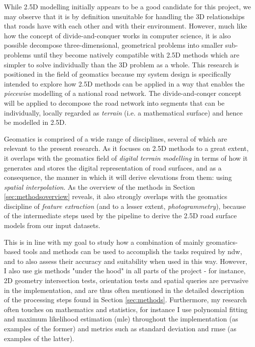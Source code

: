 While 2.5D modelling initially appears to be a good candidate for this project, we may observe that it is by definition unsuitable for handling the 3D relationships that roads have with each other and with their environment. However, much like how the concept of divide-and-conquer works in computer science, it is also possible decompose three-dimensional, geometrical problems into smaller sub-problems until they become natively compatible with 2.5D methods which are simpler to solve individually than the 3D problem as a whole. This research is positioned in the field of geomatics because my system design is specifically intended to explore how 2.5D methods can be applied in a way that enables the \textit{piecewise} modelling of a national road network. The divide-and-conqer concept will be applied to decompose the road network into segments that can be individually, locally regarded as \textit{terrain} (i.e. a mathematical surface) and hence be modelled in 2.5D.

Geomatics is comprised of a wide range of disciplines, several of which are relevant to the present research. As it focuses on 2.5D methods to a great extent, it overlaps with the geomatics field of \textit{digital terrain modelling} in terms of how it generates and stores the digital representation of road surfaces, and as a consequence, the manner in which it will derive elevations from them: using \textit{spatial interpolation}. As the overview of the methods in Section \ref{sec:methodsoverview} reveals, it also strongly overlaps with the geomatics discipline of \textit{feature extraction} (and to a lesser extent, \textit{photogrammetry}), because of the intermediate steps used by the pipeline to derive the 2.5D road surface models from our input datasets.

This is in line with my goal to study how a combination of mainly geomatics-based tools and methods can be used to accomplish the tasks required by \ac{ndw}, and to also assess their accuracy and suitability when used in this way. However, I also use \ac{gis} methods "under the hood" in all parts of the project - for instance, 2D geometry intersection tests, orientation tests and spatial queries are pervasive in the implementation, and are thus often mentioned in the detailed description of the processing steps found in Section \ref{sec:methods}. Furthermore, my research often touches on mathematics and statistics, for instance I use polynomial fitting and maximum likelihood estimation (\ac{mle}) throughout the implementation (as examples of the former) and metrics such as standard deviation and \ac{rmse} (as examples of the latter).

